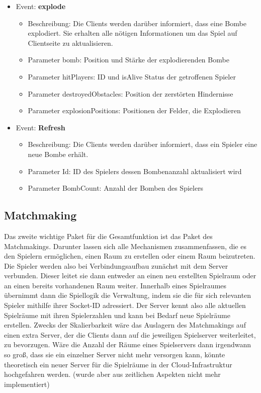 \documentclass[conference]{IEEEtran}
\begin{document}
\begin{itemize}
\begin{itemize}
\end{itemize}

\item Event: \textbf{explode}
\begin{itemize}
\item Beschreibung:
    Die Clients werden darüber informiert, dass eine Bombe explodiert. Sie erhalten alle nötigen Informationen um das Spiel auf Clientseite zu aktualisieren.
    
\item Parameter \glqq bomb\grqq{}: Position und Stärke der explodierenden Bombe
\item Parameter \glqq hitPlayers\grqq{}: ID und isAlive Status der getroffenen Spieler
\item Parameter \glqq destroyedObstacles\grqq{}: Position der zerstörten Hindernisse
\item Parameter \glqq explosionPositions\grqq{}: 
Positionen der Felder, die Explodieren
\end{itemize}

\item Event: \textbf{Refresh}
\begin{itemize}
\item Beschreibung:
    Die Clients werden darüber informiert, dass ein Spieler eine neue Bombe erhält.
    
\item Parameter \glqq Id\grqq{}: ID des Spielers dessen Bombenanzahl aktualisiert wird
\item Parameter \glqq BombCount\grqq{}: Anzahl der Bomben des Spielers
\end{itemize}

\end{itemize}
\smallskip

\subsection{Matchmaking}
Das zweite wichtige Paket für die Gesamtfunktion ist das Paket des Matchmakings. Darunter lassen sich alle Mechanismen zusammenfassen, die es den Spielern ermöglichen, einen Raum zu erstellen oder einem Raum beizutreten. Die Spieler werden also bei Verbindungsaufbau zunächst mit dem Server verbunden. Dieser leitet sie dann entweder an einen neu erstellten Spielraum oder an einen bereits vorhandenen Raum weiter. Innerhalb eines Spielraumes übernimmt dann die Spiellogik die Verwaltung, indem sie die für sich relevanten Spieler mithilfe ihrer Socket-ID adressiert. Der Server kennt also alle aktuellen Spielräume mit ihren Spielerzahlen und kann bei Bedarf neue Spielräume erstellen.\newline
Zwecks der Skalierbarkeit wäre das Auslagern des Matchmakings auf einen extra Server, der die Clients dann auf die jeweiligen Spielserver weiterleitet, zu bevorzugen.
Wäre die Anzahl der Räume eines Spielservers dann irgendwann so groß, dass sie ein einzelner Server nicht mehr versorgen kann, könnte theoretisch ein neuer Server für die Spielräume in der Cloud-Infrastruktur hochgefahren werden. (wurde aber aus zeitlichen Aspekten nicht mehr implementiert)
\end{document}
